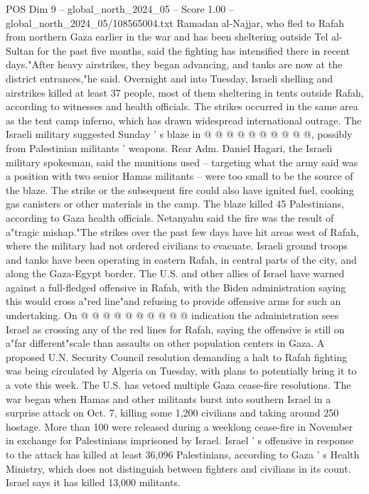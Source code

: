 \begin{textsample}{POS Dim 9 – global\_north\_2024\_05 – Score 1.00 – global\_north\_2024\_05/108565004.txt}
Ramadan al-Najjar, who fled to Rafah from northern Gaza earlier in the war and has been sheltering outside Tel al-Sultan for the past five months, said the fighting has intensified there in recent days."After heavy airstrikes, they began advancing, and tanks are now at the district entrances,"he said.
Overnight and into Tuesday, Israeli shelling and airstrikes killed at least 37 people, most of them sheltering in tents outside Rafah, according to witnesses and health officials.
The strikes occurred in the same area as the tent camp inferno, which has drawn widespread international outrage.
The Israeli military suggested Sunday ' s blaze in @ @ @ @ @ @ @ @ @ @, possibly from Palestinian militants ' weapons.
Rear Adm.
Daniel Hagari, the Israeli military spokesman, said the munitions used -- targeting what the army said was a position with two senior Hamas militants -- were too small to be the source of the blaze.
The strike or the subsequent fire could also have ignited fuel, cooking gas canisters or other materials in the camp.
The blaze killed 45 Palestinians, according to Gaza health officials.
Netanyahu said the fire was the result of a"tragic mishap."The strikes over the past few days have hit areas west of Rafah, where the military had not ordered civilians to evacuate.
Israeli ground troops and tanks have been operating in eastern Rafah, in central parts of the city, and along the Gaza-Egypt border.
The U.S. and other allies of Israel have warned against a full-fledged offensive in Rafah, with the Biden administration saying this would cross a"red line"and refusing to provide offensive arms for such an undertaking.
On @ @ @ @ @ @ @ @ @ @ indication the administration sees Israel as crossing any of the red lines for Rafah, saying the offensive is still on a"far different"scale than assaults on other population centers in Gaza.
A proposed U.N.
Security Council resolution demanding a halt to Rafah fighting was being circulated by Algeria on Tuesday, with plans to potentially bring it to a vote this week.
The U.S. has vetoed multiple Gaza cease-fire resolutions.
The war began when Hamas and other militants burst into southern Israel in a surprise attack on Oct. 7, killing some 1,200 civilians and taking around 250 hostage.
More than 100 were released during a weeklong cease-fire in November in exchange for Palestinians imprisoned by Israel.
Israel ' s offensive in response to the attack has killed at least 36,096 Palestinians, according to Gaza ' s Health Ministry, which does not distinguish between fighters and civilians in its count.
Israel says it has killed 13,000 militants.

\end{textsample}
